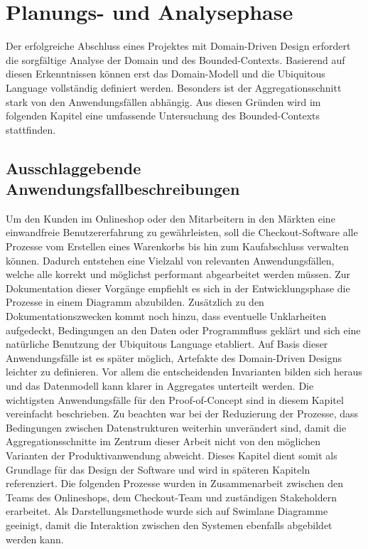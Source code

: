 

\chapter{Planungs- und Analysephase}

Der erfolgreiche Abschluss eines Projektes mit Domain-Driven Design erfordert die sorgfältige Analyse der Domain und des Bounded-Contexts. Basierend auf diesen Erkenntnissen können erst das Domain-Modell und die Ubiquitous Language vollständig definiert werden. Besonders ist der Aggregationsschnitt stark von den Anwendungsfällen abhängig. Aus diesen Gründen wird im folgenden Kapitel eine umfassende Untersuchung des Bounded-Contexts stattfinden.

\section{Ausschlaggebende Anwendungsfallbeschreibungen}


Um den Kunden im Onlineshop oder den Mitarbeitern in den Märkten eine einwandfreie Benutzererfahrung zu gewährleisten, soll die Checkout-Software alle Prozesse vom Erstellen eines Warenkorbs bis hin zum Kaufabschluss verwalten können. Dadurch entstehen eine Vielzahl von relevanten Anwendungsfällen, welche alle korrekt und möglichst performant abgearbeitet werden müssen. Zur Dokumentation dieser Vorgänge empfiehlt es sich in der Entwicklungsphase die Prozesse in einem Diagramm abzubilden. Zusätzlich zu den Dokumentationszwecken kommt noch hinzu, dass eventuelle Unklarheiten aufgedeckt, Bedingungen an den Daten oder Programmfluss geklärt und sich eine natürliche Benutzung der Ubiquitous Language etabliert. Auf Basis dieser Anwendungsfälle ist es später möglich, Artefakte des Domain-Driven Designs leichter zu definieren. Vor allem die entscheidenden Invarianten bilden sich heraus und das Datenmodell kann klarer in Aggregates unterteilt werden. Die wichtigsten Anwendungsfälle für den Proof-of-Concept sind in diesem Kapitel vereinfacht beschrieben. Zu beachten war bei der Reduzierung der Prozesse, dass Bedingungen zwischen Datenstrukturen weiterhin unverändert sind, damit die Aggregationsschnitte im Zentrum dieser Arbeit nicht von den möglichen Varianten der Produktivanwendung abweicht. Dieses Kapitel dient somit als Grundlage für das Design der Software und wird in späteren Kapiteln referenziert. Die folgenden Prozesse wurden in Zusammenarbeit zwischen den Teams des Onlineshops, dem Checkout-Team und zuständigen \Gls{Stakeholder}n erarbeitet. Als Darstellungsmethode wurde sich auf Swimlane Diagramme geeinigt, damit die Interaktion zwischen den Systemen ebenfalls abgebildet werden kann.

